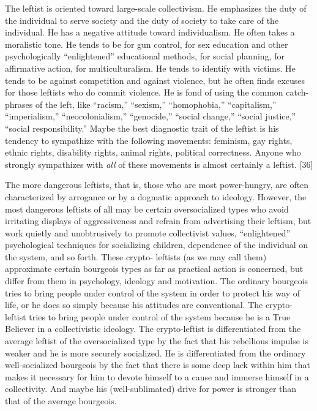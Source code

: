  The leftist is oriented toward large-scale collectivism. He emphasizes the duty of the individual to serve society and the duty of society to take care of the individual. He has a negative attitude toward individualism. He often takes a moralistic tone. He tends to be for gun control, for sex education and other psychologically “enlightened” educational methods, for social planning, for affirmative action, for multiculturalism. He tends to identify with victims. He tends to be against competition and against violence, but he often finds excuses for those leftists who do commit violence. He is fond of using the common catch- phrases of the left, like “racism,” “sexism,” “homophobia,” “capitalism,” “imperialism,” “neocolonialism,” “genocide,” “social change,” “social justice,” “social responsibility.” Maybe the best diagnostic trait of the leftist is his tendency to sympathize with the following movements: feminism, gay rights, ethnic rights, disability rights, animal rights, political correctness. Anyone who strongly sympathizes with {\em all} of these movements is almost certainly a leftist. [36]

 The more dangerous leftists, that is, those who are most power-hungry, are often characterized by arrogance or by a dogmatic approach to ideology. However, the most dangerous leftists of all may be certain oversocialized types who avoid irritating displays of aggressiveness and refrain from advertising their leftism, but work quietly and unobtrusively to promote collectivist values, “enlightened” psychological techniques for socializing children, dependence of the individual on the system, and so forth. These crypto- leftists (as we may call them) approximate certain bourgeois types as far as practical action is concerned, but differ from them in psychology, ideology and motivation. The ordinary bourgeois tries to bring people under control of the system in order to protect his way of life, or he does so simply because his attitudes are conventional. The crypto-leftist tries to bring people under control of the system because he is a True Believer in a collectivistic ideology. The crypto-leftist is differentiated from the average leftist of the oversocialized type by the fact that his rebellious impulse is weaker and he is more securely socialized. He is differentiated from the ordinary well-socialized bourgeois by the fact that there is some deep lack within him that makes it necessary for him to devote himself to a cause and immerse himself in a collectivity. And maybe his (well-sublimated) drive for power is stronger than that of the average bourgeois.

